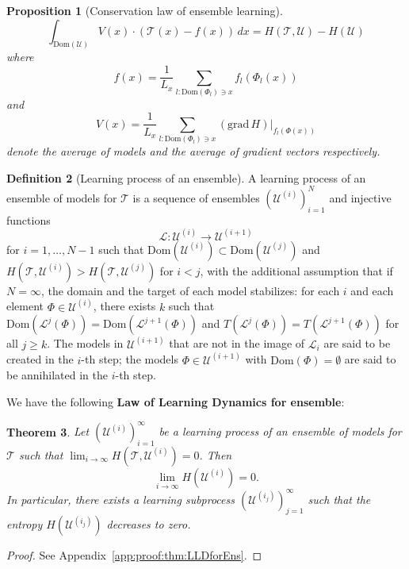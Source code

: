 \documentclass{article}
\theoremstyle{plain}
\newtheorem{theorem}{Theorem}[section]
\newtheorem{proposition}[theorem]{Proposition}
\theoremstyle{definition}
\newtheorem{definition}[theorem]{Definition}
\theoremstyle{remark}
\newcommand{\cT}{\mathcal{T}}
\newcommand{\cU}{\mathcal{U}}
\newcommand{\Dom}{\mathrm{Dom}}
\begin{document}
\begin{proposition}[Conservation law of ensemble learning]
\begin{equation}
\int_{\Dom(\cU)} V(x) \cdot (\cT(x) - f(x)) \,dx = H(\cT,\cU) - H(\cU)
\end{equation}
where 
\begin{equation}
	f(x) = \frac{1}{L_x}\sum_{l: \Dom(\Phi_l)\ni x} f_l(\Phi_l(x))
\end{equation}
and
\begin{equation}
	V(x) = \frac{1}{L_x}\sum_{l: \Dom(\Phi_l)\ni x} (\mathrm{grad}\, H)|_{f_l(\Phi(x))}
\end{equation}
denote the average of models and the average of gradient vectors respectively.
\end{proposition}
 
\begin{definition}[Learning process of an ensemble] \label{def:learning_ensemble}
	A learning process of an ensemble of models for $\cT$ is a sequence of ensembles $(\cU^{(i)})_{i=1}^N$ and injective functions 
	$$\mathcal{L}:\cU^{(i)} \to \cU^{(i+1)}$$ 
	for $i=1,\ldots,N-1$ such that $\Dom(\cU^{(i)}) \subset \Dom(\cU^{(j)})$ and $H(\cT,\cU^{(i)}) > H(\cT,\cU^{(j)})$ for $i < j$, with the additional assumption that if $N=\infty$, the domain and the target of each model stabilizes: for each $i$ and each element $\Phi \in \cU^{(i)}$, there exists $k$ such that $\Dom(\mathcal{L}^j(\Phi)) = \Dom(\mathcal{L}^{j+1}(\Phi))$ and $T(\mathcal{L}^j(\Phi)) = T(\mathcal{L}^{j+1}(\Phi))$ for all $j\geq k$. The models in $\cU^{(i+1)}$ that are not in the image of $\mathcal{L}_i$ are said to be created in the $i$-th step; the models $\Phi \in \cU^{(i+1)}$ with $\Dom(\Phi) = \emptyset$ are said to be annihilated in the $i$-th step.
\end{definition}

We have the following \textbf{Law of Learning Dynamics for ensemble}:

\begin{theorem}\label{thm:LLDforEns}
Let $(\cU^{(i)})_{i=1}^\infty$ be a learning process of an ensemble of models for $\cT$ such that $\lim_{i\to\infty} H(\cT,\cU^{(i)}) = 0$. Then 
$$\lim_{i\to\infty} H(\cU^{(i)}) = 0.$$
In particular, there exists a learning subprocess $(\cU^{(i_j)})_{j=1}^\infty$ such that the entropy $H(\cU^{(i_j)})$ decreases to zero.
\end{theorem}

\begin{proof}
	See Appendix~\ref{app:proof:thm:LLDforEns}.
\end{proof}
\end{document}
